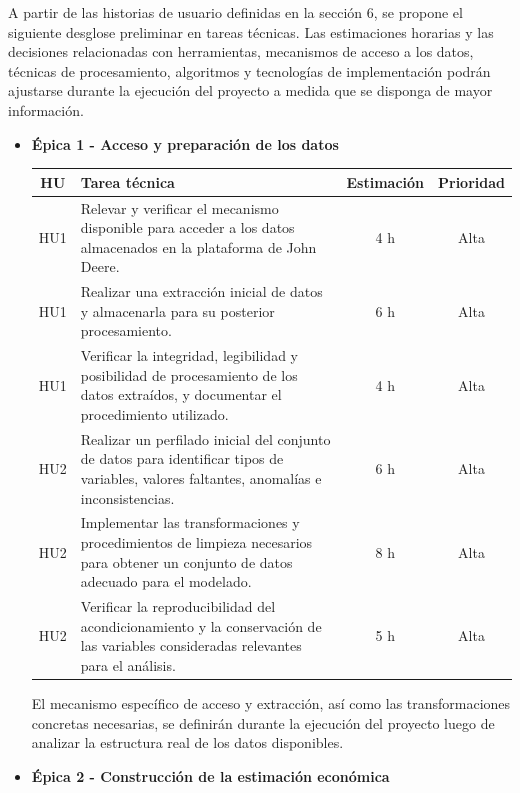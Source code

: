 \documentclass[
11pt, %
]{charter}
\begin{document}
A partir de las historias de usuario definidas en la sección 6, se propone el siguiente desglose preliminar en tareas técnicas. Las estimaciones horarias y las decisiones relacionadas con herramientas, mecanismos de acceso a los datos, técnicas de procesamiento, algoritmos y tecnologías de implementación podrán ajustarse durante la ejecución del proyecto a medida que se disponga de mayor información.

\begin{itemize}

  \item \textbf{\'{E}pica 1 - Acceso y preparación de los datos}

  \begin{center}
  \begin{tabular}{|c|p{9cm}|c|c|}
  \hline
  \textbf{HU} & \textbf{Tarea técnica} & \textbf{Estimación} & \textbf{Prioridad} \\
  \hline
  HU1 & Relevar y verificar el mecanismo disponible para acceder a los datos almacenados en la plataforma de John Deere. & 4 h & Alta \\
  \hline
  HU1 & Realizar una extracción inicial de datos y almacenarla para su posterior procesamiento. & 6 h & Alta \\
  \hline
  HU1 & Verificar la integridad, legibilidad y posibilidad de procesamiento de los datos extraídos, y documentar el procedimiento utilizado. & 4 h & Alta \\
  \hline
  HU2 & Realizar un perfilado inicial del conjunto de datos para identificar tipos de variables, valores faltantes, anomalías e inconsistencias. & 6 h & Alta \\
  \hline
  HU2 & Implementar las transformaciones y procedimientos de limpieza necesarios para obtener un conjunto de datos adecuado para el modelado. & 8 h & Alta \\
  \hline
  HU2 & Verificar la reproducibilidad del acondicionamiento y la conservación de las variables consideradas relevantes para el análisis. & 5 h & Alta \\
  \hline
  \end{tabular}
  \end{center}

  El mecanismo específico de acceso y extracción, así como las transformaciones concretas necesarias, se definirán durante la ejecución del proyecto luego de analizar la estructura real de los datos disponibles.


  \item \textbf{\'{E}pica 2 - Construcción de la estimación económica}


\end{itemize}
\end{document}

